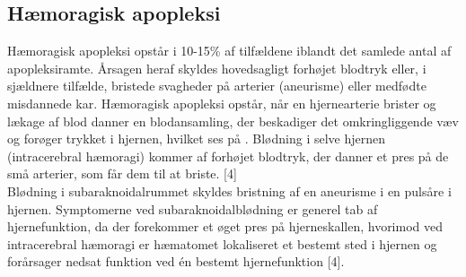 \subsection{Hæmoragisk apopleksi}
Hæmoragisk apopleksi opstår i 10-15\% af tilfældene iblandt det samlede antal af apopleksiramte\cite{Sundhed.dk2014}. Årsagen heraf skyldes hovedsagligt forhøjet blodtryk eller, i sjældnere tilfælde, bristede svagheder på arterier (aneurisme) eller medfødte misdannede kar\cite{Schulze2011}. Hæmoragisk apopleksi opstår, når en hjernearterie brister og lækage af blod danner en blodansamling, der beskadiger det omkringliggende væv og forøger trykket i hjernen, hvilket ses på . Blødning i selve hjernen (intracerebral hæmoragi) kommer af forhøjet blodtryk, der danner et pres på de små arterier, som får dem til at briste. [4] \\
Blødning i subaraknoidalrummet skyldes bristning af en aneurisme i en pulsåre i hjernen\cite{Schulze2011}. Symptomerne ved subaraknoidalblødning er generel tab af hjernefunktion, da der forekommer et øget pres på hjerneskallen, hvorimod ved intracerebral hæmoragi er hæmatomet lokaliseret et bestemt sted i hjernen og forårsager nedsat funktion ved én bestemt hjernefunktion [4]. 









